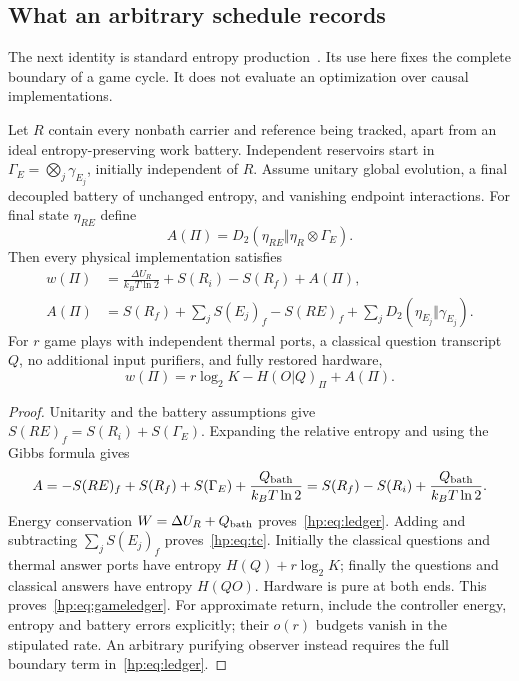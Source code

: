 \subsection{What an arbitrary schedule records}\label{hp:sec:schedules}
The next identity is standard entropy production~\cite{EspositoLindenbergVandenBroeck10,ReebWolf14}. Its use here fixes the complete boundary of a game cycle. It does not evaluate an optimization over causal implementations.

\begin{proposition}\label{hp:prop:ledger}
Let $R$ contain every nonbath carrier and reference being tracked, apart from an ideal entropy-preserving work battery. Independent reservoirs start in $\Gamma_E=\bigotimes_j\gamma_{E_j}$, initially independent of $R$. Assume unitary global evolution, a final decoupled battery of unchanged entropy, and vanishing endpoint interactions. For final state $\eta_{RE}$ define
\[
 A(\Pi)=D_2(\eta_{RE}\Vert\eta_R\otimes\Gamma_E).
\]
Then every physical implementation satisfies
\begin{align}
 w(\Pi)&=\frac{\Delta U_R}{k_BT\ln2}+S(R_i)-S(R_f)+A(\Pi),\label{hp:eq:ledger}\\
 A(\Pi)&=S(R_f)+\sum_jS(E_j)_f-S(RE)_f
             +\sum_jD_2(\eta_{E_j}\Vert\gamma_{E_j}).\label{hp:eq:tc}
\end{align}
For $r$ game plays with independent thermal ports, a classical question transcript $Q$, no additional input purifiers, and fully restored hardware,
\begin{equation}
 w(\Pi)=r\log_2K-H(O|Q)_\Pi+A(\Pi).\label{hp:eq:gameledger}
\end{equation}
\end{proposition}
\begin{proof}
Unitarity and the battery assumptions give $S(RE)_f=S(R_i)+S(\Gamma_E)$. Expanding the relative entropy and using the Gibbs formula gives
\[
 A=-S(RE)_f+S(R_f)+S(\Gamma_E)+\frac{Q_{\rm bath}}{k_BT\ln2}
   =S(R_f)-S(R_i)+\frac{Q_{\rm bath}}{k_BT\ln2}.
\]
Energy conservation $W=\Delta U_R+Q_{\rm bath}$ proves~\eqref{hp:eq:ledger}. Adding and subtracting $\sum_jS(E_j)_f$ proves~\eqref{hp:eq:tc}. Initially the classical questions and thermal answer ports have entropy $H(Q)+r\log_2K$; finally the questions and classical answers have entropy $H(QO)$. Hardware is pure at both ends. This proves~\eqref{hp:eq:gameledger}. For approximate return, include the controller energy, entropy and battery errors explicitly; their $o(r)$ budgets vanish in the stipulated rate. An arbitrary purifying observer instead requires the full boundary term in~\eqref{hp:eq:ledger}.
\end{proof}

